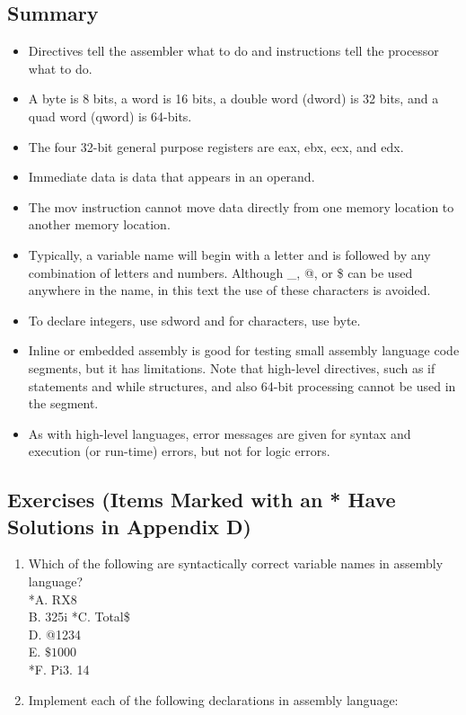 \documentclass[10pt]{book}
\begin{document}
\subsection{Summary}
\begin{itemize}
  \item Directives tell the assembler what to do and instructions tell the processor what to do.
  \item A byte is 8 bits, a word is 16 bits, a double word (dword) is 32 bits, and a quad word (qword) is 64-bits.
  \item The four 32-bit general purpose registers are eax, ebx, ecx, and edx.
  \item Immediate data is data that appears in an operand.
  \item The mov instruction cannot move data directly from one memory location to another memory location.
  \item Typically, a variable name will begin with a letter and is followed by any combination of letters and numbers. Although \_, @, or \$ can be used anywhere in the name, in this text the use of these characters is avoided.
  \item To declare integers, use sdword and for characters, use byte.
  \item Inline or embedded assembly is good for testing small assembly language code segments, but it has limitations. Note that high-level directives, such as if statements and while structures, and also 64-bit processing cannot be used in the segment.
  \item As with high-level languages, error messages are given for syntax and execution (or run-time) errors, but not for logic errors.
\end{itemize}


\subsection{Exercises (Items Marked with an * Have Solutions in Appendix D)}
\begin{enumerate}
  \item Which of the following are syntactically correct variable names in assembly language?\\
*A. RX8\\
B. 325i *C. Total\$\\
D. @1234\\
E. $\$ 1000$\\
*F. Pi3. 14
  \item Implement each of the following declarations in assembly language:
\end{enumerate}
\end{document}
